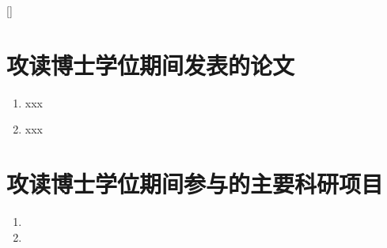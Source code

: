 
[]

\section{攻读博士学位期间发表的论文}
\begin{enumerate}
\item xxx

\item xxx
\end{enumerate}

\newpage
\section{攻读博士学位期间参与的主要科研项目}

\begin{enumerate}
    \item 
    \item 
\end{enumerate}



